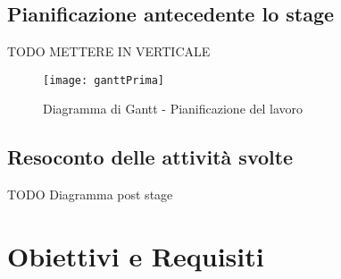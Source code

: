 \subsection{Pianificazione antecedente lo stage}

TODO METTERE IN VERTICALE
\begin{figure}[!h] 
    \centering 
    \texttt{[image: ganttPrima]} 
    \caption{Diagramma di Gantt - Pianificazione del lavoro}
\end{figure}

\subsection{Resoconto delle attività svolte}

TODO Diagramma post stage

\section{Obiettivi e Requisiti}

